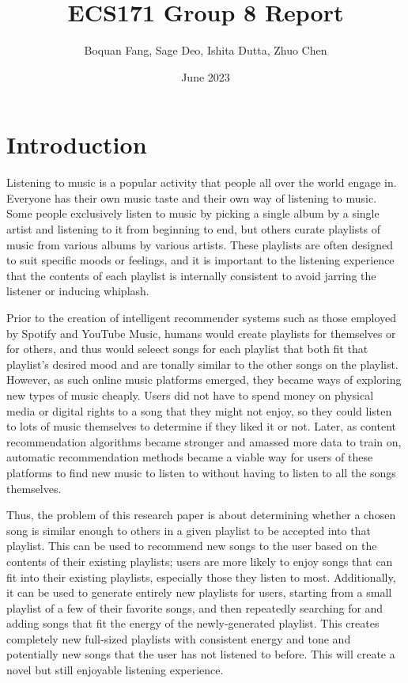 \documentclass{article}
\title{ECS171 Group 8 Report}
\author{Boquan Fang, Sage Deo, Ishita Dutta, Zhuo Chen}
\date{June 2023}
\begin{document}
\section{Introduction}
Listening to music is a popular activity that people all over the world engage in. 
Everyone has their own music taste and their own way of listening to music.
Some people exclusively listen to music by picking a single album by a single artist 
and listening to it from beginning to end, but others curate playlists of music from
various albums by various artists. These playlists are often designed to suit specific
moods or feelings, and it is important to the listening experience that the contents of
each playlist is internally consistent to avoid jarring the listener or inducing whiplash.

Prior to the creation of intelligent recommender systems such as those employed by 
Spotify and YouTube Music, humans would create playlists for themselves or for others,
and thus would seleect songs for each playlist that both fit that playlist's desired mood
and are tonally similar to the other songs on the playlist. However, as such 
online music platforms emerged, they became ways of exploring new types of music cheaply.
Users did not have to spend money on physical media or digital rights to a song that they
might not enjoy, so they could listen to lots of music themselves to determine if they liked it
or not. Later, as content recommendation algorithms became stronger and amassed more data
to train on, automatic recommendation methods became a viable way for users of these platforms
to find new music to listen to without having to listen to all the songs themselves. 

Thus, the problem of this research paper is about determining whether a chosen song is similar enough to others in a given playlist to be accepted into that playlist. This can be used to recommend new songs to the user based on the contents of their existing playlists; users are more likely
to enjoy songs that can fit into their existing playlists, especially those they listen to most.
Additionally, it can be used to generate entirely new playlists for users, starting from a small
playlist of a few of their favorite songs, and then repeatedly searching for and adding songs that
fit the energy of the newly-generated playlist. This creates completely new full-sized playlists 
with consistent energy and tone and potentially new songs that the user has not listened to before.
This will create a novel but still enjoyable listening experience. 
\end{document}
